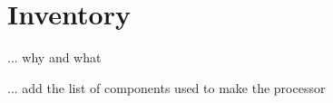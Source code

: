 \section{Inventory} \label{sec:inventory}

... why and what

... add the list of components used to make the processor
